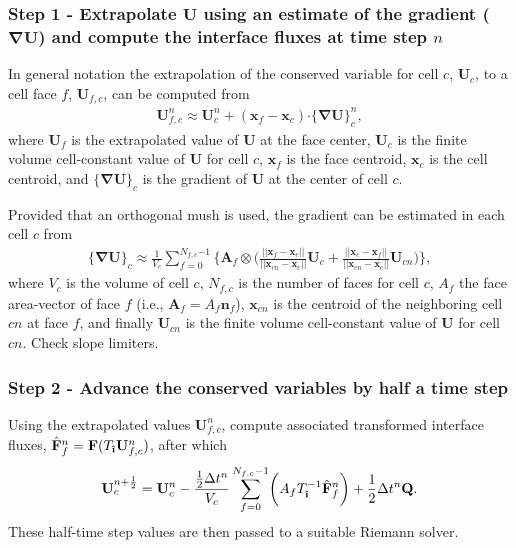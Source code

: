 \documentclass[10pt,letterpaper,notitlepage]{article}
\numberwithin{equation}{section}
\newcommand{\bnabla}{\boldsymbol{\nabla}}
\newcommand{\position}{\mathbf{x}}
\newcommand{\dotp}{\boldsymbol{\cdot}}
\newcommand{\uvec}[1]{\boldsymbol{\hat{\textbf{#1}}}}
\newcommand{\ihat}{\uvec{\i}}
\newcommand{\hatbf}[1]{\hat{\mathbf{#1}}}
\newcommand{\beqn}{\begin{equation}\begin{aligned}}
\newcommand{\eeqn}{\end{aligned}\end{equation}}
\begin{document}
\subsubsection{Step 1 - Extrapolate $\mathbf{U}$ using an estimate of the gradient ($\bnabla \mathbf{U}$) and compute the interface fluxes at time step $n$}
In general notation the extrapolation of the conserved variable for cell $c$, $\mathbf{U}_c$, to a cell face $f$, $\mathbf{U}_{f,c}$, can be computed from
\beqn 
\mathbf{U}_{f,c}^n \approx \mathbf{U}_c^n + (\position_{f} - \position_c) \dotp \big\{ \bnabla \mathbf{U} \big\}_c^n,
\eeqn 
where $\mathbf{U}_f$ is the extrapolated value of $\mathbf{U}$ at the face center, $\mathbf{U}_c$ is the finite volume cell-constant value of $\mathbf{U}$ for cell $c$, $\position_f$ is the face centroid, $\position_c$ is the cell centroid, and $\big\{ \bnabla \mathbf{U} \big\}_c$ is the gradient of $\mathbf{U}$ at the center of cell $c$.

Provided that an orthogonal mush is used, the gradient can be estimated in each cell $c$ from
\beqn 
\big\{ \bnabla \mathbf{U} \big\}_c 
\approx
\frac{1}{V_c}
\sum_{f=0}^{N_{f,c}{-1}}  
\biggr\{
\mathbf{A}_f \otimes
\biggr(
\frac{||\position_f - \position_c||}{||\position_{cn} - \position_c||} \mathbf{U}_c 
+
\frac{||\position_c - \position_f||}{||\position_{cn} - \position_c||} \mathbf{U}_{cn} 
\biggr)
\biggr\},
\eeqn 
where $V_c$ is the volume of cell $c$, $N_{f,c}$ is the number of faces for cell $c$, $A_f$ the face area-vector of face $f$ (i.e., $\mathbf{A}_f = A_f \mathbf{n}_f$), $\position_{cn}$ is the centroid of the neighboring cell $cn$ at face $f$, and finally $\mathbf{U}_{cn}$ is the finite volume cell-constant value of $\mathbf{U}$ for cell $cn$.
\newline
\newline
{\color{red} Check slope limiters. }

%

\subsubsection{Step 2 - Advance the conserved variables by half a time step}
Using the extrapolated values $\mathbf{U}_{f,c}^n$, compute associated transformed interface fluxes, $\hatbf{F}_f^n = \mathbf{F}(T_{\ihat} \mathbf{U}_{f,c}^n)$, after which
\beqn 
\mathbf{U}_c^{n{+}\frac{1}{2}} = \mathbf{U}_c^n - \frac{\frac{1}{2}\Delta t^n}{V_c} \sum_{f=0}^{N_{f,c}{-1}} 
\biggr(
A_f T_{\ihat}^{-1} \hatbf{F}_f^n
\biggr)
+ \frac{1}{2}\Delta t^n \mathbf{Q}.
\eeqn 
These half-time step values are then passed to a suitable Riemann solver.
\end{document}
